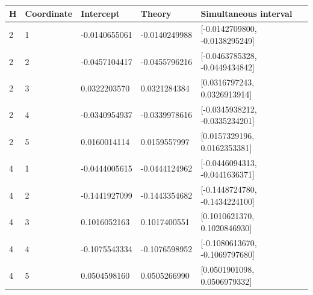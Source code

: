 \begin{tabular}{lllll}
H & Coordinate & Intercept & Theory & Simultaneous interval \\
\hline
2 & 1 & -0.0140655061 & -0.0140249988 & [-0.0142709800, -0.0138295249] \\
2 & 2 & -0.0457104417 & -0.0455796216 & [-0.0463785328, -0.0449434842] \\
2 & 3 & 0.0322203570 & 0.0321284384 & [0.0316797243, 0.0326913914] \\
2 & 4 & -0.0340954937 & -0.0339978616 & [-0.0345938212, -0.0335234201] \\
2 & 5 & 0.0160014114 & 0.0159557997 & [0.0157329196, 0.0162353381] \\
4 & 1 & -0.0444005615 & -0.0444124962 & [-0.0446094313, -0.0441636371] \\
4 & 2 & -0.1441927099 & -0.1443354682 & [-0.1448724780, -0.1434224100] \\
4 & 3 & 0.1016052163 & 0.1017400551 & [0.1010621370, 0.1020846930] \\
4 & 4 & -0.1075543334 & -0.1076598952 & [-0.1080613670, -0.1069797680] \\
4 & 5 & 0.0504598160 & 0.0505266990 & [0.0501901098, 0.0506979332] \\
\end{tabular}
